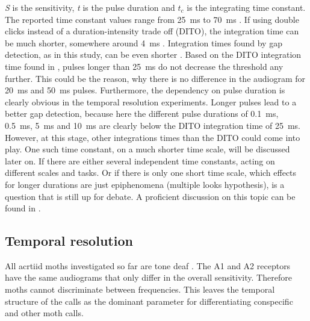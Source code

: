 \documentclass[12pt,a4paper]{article}
\begin{document}
\textit{S} is the sensitivity, \textit{t} is the pulse duration and \textit{$t_c$} is the integrating time constant. The reported time constant values range from 25~ms \cite{surlykke1988} to 70~ms \cite{waters1996}. If using double clicks instead of a duration-intensity trade off (DITO), the integration time can be much shorter, somewhere around 4~ms \cite{tougaard1998}. Integration times found by gap detection, as in this study, can be even shorter \cite{surlykke1988}.
Based on the DITO integration time found in  \cite{surlykke1988}, pulses longer than 25~ms do not decrease the threshold any further. This could be the reason, why there is no difference in the audiogram for 20~ms and 50~ms pulses. Furthermore, the dependency on pulse duration is clearly obvious in the temporal resolution experiments. Longer pulses lead to a better gap detection, because here the different pulse durations of 0.1~ms, 0.5~ms, 5~ms and 10~ms are clearly below the DITO integration time of 25~ms. However, at this stage, other integrations times than the DITO could come into play. One such time constant, on a much shorter time scale, will be discussed later on. If there are either several independent time constants, acting on different scales and tasks. Or if there is only one short time scale, which effects for longer durations are just epiphenomena (multiple looks hypothesis), is a question that is still up for debate. A proficient discussion on this topic can be found in \cite{viemeister1991}. 

\subsection{Temporal resolution}
All acrtiid moths investigated so far are tone deaf \cite{waters2003}. The A1 and A2 receptors have the same audiograms that only differ in the overall sensitivity. Therefore moths cannot discriminate between frequencies. This leaves the temporal structure of the calls as the dominant parameter for differentiating conspecific and other moth calls. 
\end{document}
